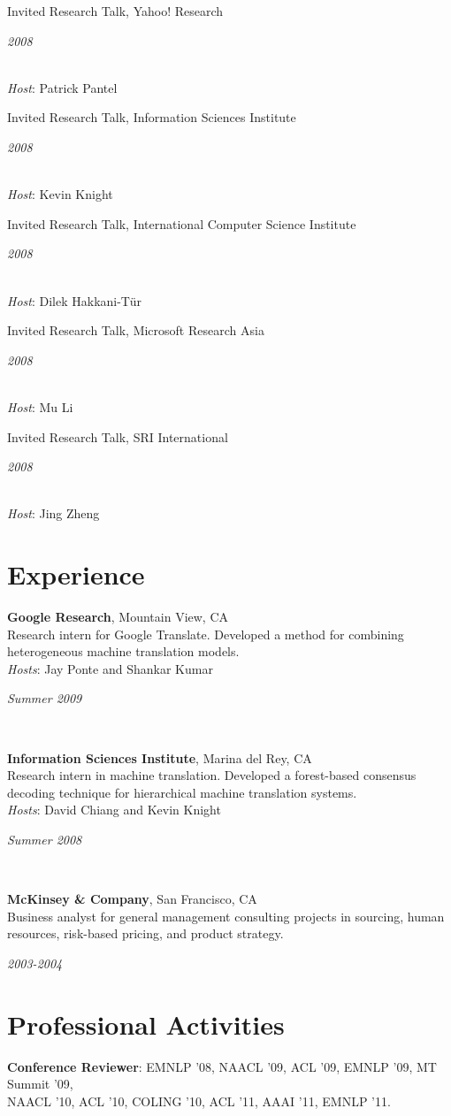 \documentclass[margin,line]{res}
\newcommand{\dated}[2]{\parbox[t]{4.4in}{#1} \hspace{0.4in}
											 \parbox[t]{1in}{ {\it #2 } } }
\begin{document}
\begin{resume}
\dated{Invited Research Talk, Yahoo! Research}{2008} \\
{\em Host}: Patrick Pantel 

\dated{Invited Research Talk, Information Sciences Institute}{2008} \\
{\em Host}: Kevin Knight 

\dated{Invited Research Talk, International Computer Science Institute}{2008} \\
{\em Host}: Dilek Hakkani-T\"{u}r 

\dated{Invited Research Talk, Microsoft Research Asia}{2008} \\
{\em Host}: Mu Li 

\dated{Invited Research Talk, SRI International}{2008} \\
{\em Host}: Jing Zheng 

\section{\sc Experience}

\dated{ {\bf Google Research}, Mountain View, CA\\
Research intern for Google Translate.  Developed a method for combining
heterogeneous machine translation models. \\
{\em Hosts}: Jay Ponte and Shankar Kumar
}{Summer 2009} \\

\dated{ {\bf Information Sciences Institute}, Marina del Rey, CA \\
Research intern in machine translation. Developed a forest-based consensus
decoding technique for hierarchical machine translation systems. \\
{\em Hosts}: David Chiang and Kevin Knight}{Summer 2008} \\

\dated{ {\bf McKinsey \& Company}, San Francisco, CA \\
Business analyst for general management consulting projects in sourcing, human
resources, risk-based pricing, and product strategy.}{2003-2004}

\newpage

\section{\sc Professional Activities}

{\bf Conference Reviewer}: EMNLP '08, NAACL '09, ACL '09, EMNLP '09, MT Summit
'09,\\ NAACL '10, ACL '10, COLING '10, ACL '11, AAAI '11, EMNLP '11. 


\end{resume}
\end{document}
